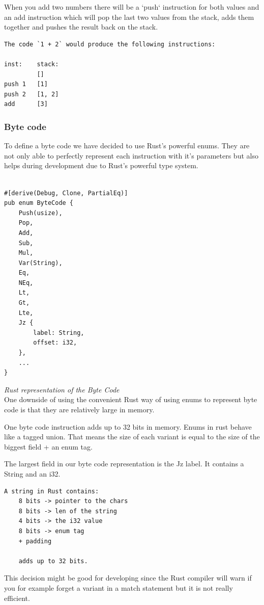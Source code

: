\documentclass{article}
\begin{document}
When you add two numbers there will be a `push` instruction for both values
and an add instruction which will pop the last two values from the stack,
adds them together and pushes the result back on the stack.

\begin{verbatim}
The code `1 + 2` would produce the following instructions:

inst:    stack:
         []
push 1   [1]
push 2   [1, 2]
add      [3]
\end{verbatim}

\subsubsection{Byte code}
\label{sec:byte_code}
To define a byte code we have decided to use Rust's powerful enums. They are
not only able to perfectly represent each instruction with it's parameters but
also helps during development due to Rust's powerful type system.

\begin{verbatim}

#[derive(Debug, Clone, PartialEq)]
pub enum ByteCode {
    Push(usize),
    Pop,
    Add,
    Sub,
    Mul,
    Var(String),
    Eq,
    NEq,
    Lt,
    Gt,
    Lte,
    Jz {
        label: String,
        offset: i32,
    },
    ...
}

\end{verbatim}
\textit{Rust representation of the Byte Code} \\

One downside of using the convenient Rust way of using enums to represent byte
code is that they are relatively large in memory.

One byte code instruction adds up to 32 bits in memory. 
Enums in rust behave like a tagged union. That means the size of each variant
is equal to the size of the biggest field + an enum tag.

The largest field in our byte code representation is the Jz label. It contains
a String and an i32.

\begin{verbatim}
A string in Rust contains:
    8 bits -> pointer to the chars
    8 bits -> len of the string
    4 bits -> the i32 value
    8 bits -> enum tag
    + padding

    adds up to 32 bits.
\end{verbatim}

This decision might be good for developing since the Rust compiler will warn 
if you for example forget a variant in a match statement but it is not really
efficient.
\end{document}
